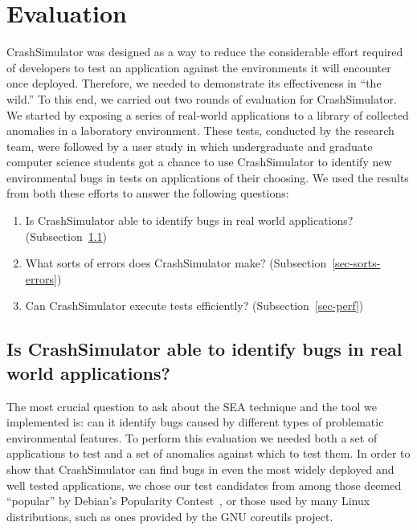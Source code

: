 \section{Evaluation}
\label{SEC:evaluation}

CrashSimulator was designed
as a way to reduce the considerable effort
required of developers to test an application
against the environments it will encounter once deployed.
Therefore,
we needed to demonstrate its effectiveness in ``the wild.''
To this end,
we carried out two rounds of
evaluation for CrashSimulator.
We started by exposing
a series of real-world applications
to a library of collected anomalies in a laboratory environment.
These tests,
conducted by the research team,
were followed by a user study
in which undergraduate and graduate computer science students
got a chance to use CrashSimulator
to identify new environmental bugs
in tests on applications of their choosing.
We used the results from both these efforts
to answer the following questions:

\begin{enumerate}

\item{Is CrashSimulator able to identify bugs in real world applications?
    (Subsection~\ref{sec-env-bugs})}

\item{What sorts of errors does CrashSimulator make?
    (Subsection~\ref{sec-sorts-errors})}

\item{Can CrashSimulator
      execute tests efficiently? (Subsection~\ref{sec-perf})}

\end{enumerate}

\subsection{Is CrashSimulator able to identify bugs in real world
applications?}
\label{sec-env-bugs}

The most crucial question to ask about the SEA technique and the tool we
implemented is:
can it identify bugs
caused by different types of problematic environmental features.
To perform this evaluation we needed both a set of applications to test
and a set of anomalies against which to test them.
In order to show that CrashSimulator
can find bugs in even the most widely deployed
and well tested applications,
we chose our test candidates
from among those deemed ``popular''
by Debian's Popularity Contest~\cite{DebPopCon},
or those used
by many Linux distributions,
such as ones provided
by the GNU coreutils project.

